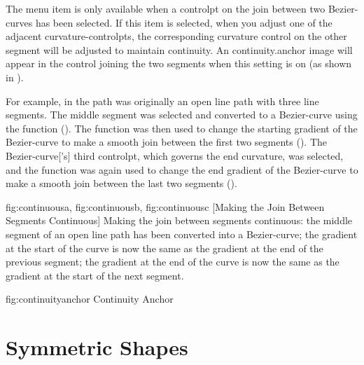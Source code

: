 
The  menu item is only available
when a \gls*{controlpt} on the join between two \glspl{Bezier-curve}
has been selected. If this item is selected, when you adjust one of
the adjacent \glspl{curvature-controlpt}, the corresponding curvature
control on the other segment will be adjusted to maintain
\gls{continuity}. An \gls{continuity.anchor} image will appear in the control joining the
two segments when this setting is on (as shown in
).

For example, in  the path was originally
an open line \gls{path} with three line segments.  The middle segment was
selected and converted to a \gls{Bezier-curve} using the
 function
(). The
 function was then
used to change the starting \gls{gradient} of the \gls{Bezier-curve} to make
a smooth join between the first two segments
().  The \gls{Bezier-curve}['s] third
\gls*{controlpt}, which governs the end curvature, was selected, and
the  function was
again used to change the end \gls{gradient} of the \gls{Bezier-curve} to
make a smooth join between the last two segments
().

{
 {fig:continuousa}{}{},
 {fig:continuousb}{}{},
 {fig:continuousc}{}{}
}
[Making the Join Between Segments Continuous]
{Making the join between segments continuous: 
 the middle segment of
an open line path has been converted into a \gls{Bezier-curve};
 the gradient at the start of the curve is now the same as
the gradient at the end of the previous segment; 
 the
gradient at the end of the curve is now the same as the gradient at
the start of the next segment.}

\FloatFig
  {fig:continuityanchor}
   {}
   {Continuity Anchor}


\section{Symmetric Shapes}\label{sec:symmetric}

